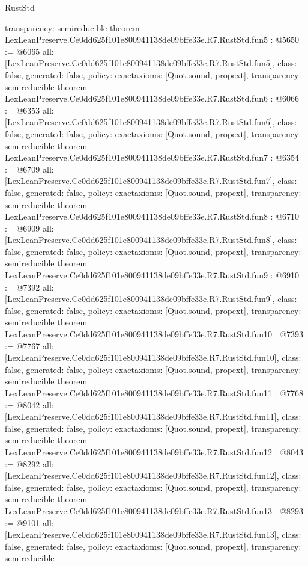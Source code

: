 \begin{lexlean}{RustStd}
\begin{coremodule}
{  transparency: semireducible
}
theorem LexLeanPreserve.Ce0dd625f101e800941138de09bffe33e.R7.RustStd.fun5 : @5650 := @6065 {
  all: [LexLeanPreserve.Ce0dd625f101e800941138de09bffe33e.R7.RustStd.fun5],
  class: false,
  generated: false,
  policy: exact{axioms: [Quot.sound, propext]},
  transparency: semireducible
}
theorem LexLeanPreserve.Ce0dd625f101e800941138de09bffe33e.R7.RustStd.fun6 : @6066 := @6353 {
  all: [LexLeanPreserve.Ce0dd625f101e800941138de09bffe33e.R7.RustStd.fun6],
  class: false,
  generated: false,
  policy: exact{axioms: [Quot.sound, propext]},
  transparency: semireducible
}
theorem LexLeanPreserve.Ce0dd625f101e800941138de09bffe33e.R7.RustStd.fun7 : @6354 := @6709 {
  all: [LexLeanPreserve.Ce0dd625f101e800941138de09bffe33e.R7.RustStd.fun7],
  class: false,
  generated: false,
  policy: exact{axioms: [Quot.sound, propext]},
  transparency: semireducible
}
theorem LexLeanPreserve.Ce0dd625f101e800941138de09bffe33e.R7.RustStd.fun8 : @6710 := @6909 {
  all: [LexLeanPreserve.Ce0dd625f101e800941138de09bffe33e.R7.RustStd.fun8],
  class: false,
  generated: false,
  policy: exact{axioms: [Quot.sound, propext]},
  transparency: semireducible
}
theorem LexLeanPreserve.Ce0dd625f101e800941138de09bffe33e.R7.RustStd.fun9 : @6910 := @7392 {
  all: [LexLeanPreserve.Ce0dd625f101e800941138de09bffe33e.R7.RustStd.fun9],
  class: false,
  generated: false,
  policy: exact{axioms: [Quot.sound, propext]},
  transparency: semireducible
}
theorem LexLeanPreserve.Ce0dd625f101e800941138de09bffe33e.R7.RustStd.fun10 : @7393 := @7767 {
  all: [LexLeanPreserve.Ce0dd625f101e800941138de09bffe33e.R7.RustStd.fun10],
  class: false,
  generated: false,
  policy: exact{axioms: [Quot.sound, propext]},
  transparency: semireducible
}
theorem LexLeanPreserve.Ce0dd625f101e800941138de09bffe33e.R7.RustStd.fun11 : @7768 := @8042 {
  all: [LexLeanPreserve.Ce0dd625f101e800941138de09bffe33e.R7.RustStd.fun11],
  class: false,
  generated: false,
  policy: exact{axioms: [Quot.sound, propext]},
  transparency: semireducible
}
theorem LexLeanPreserve.Ce0dd625f101e800941138de09bffe33e.R7.RustStd.fun12 : @8043 := @8292 {
  all: [LexLeanPreserve.Ce0dd625f101e800941138de09bffe33e.R7.RustStd.fun12],
  class: false,
  generated: false,
  policy: exact{axioms: [Quot.sound, propext]},
  transparency: semireducible
}
theorem LexLeanPreserve.Ce0dd625f101e800941138de09bffe33e.R7.RustStd.fun13 : @8293 := @9101 {
  all: [LexLeanPreserve.Ce0dd625f101e800941138de09bffe33e.R7.RustStd.fun13],
  class: false,
  generated: false,
  policy: exact{axioms: [Quot.sound, propext]},
  transparency: semireducible
}
\end{coremodule}
\end{lexlean}
